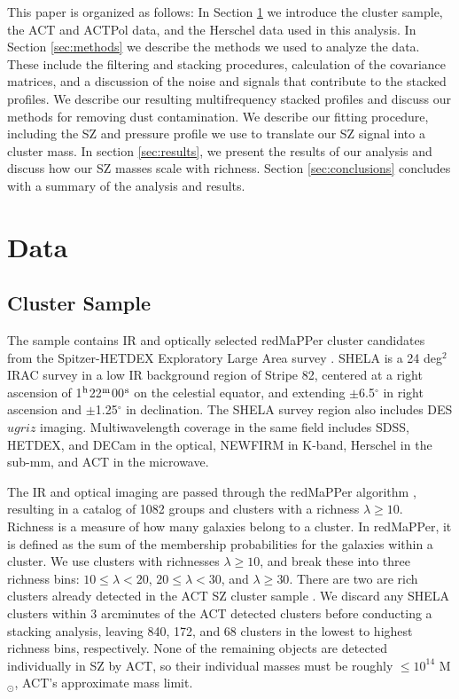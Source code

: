 \documentclass[a4paper,fleqn,usenatbib]{mnras}
\begin{document}
This paper is organized as follows: In Section \ref{sec:data} we introduce the cluster sample, the ACT and ACTPol data, and the Herschel data used in this analysis. In Section \ref{sec:methods} we describe the methods we used to analyze the data. These include the filtering and stacking procedures, calculation of the covariance matrices, and a discussion of the noise and signals that contribute to the stacked profiles. We describe our resulting multifrequency stacked profiles 
and discuss our methods for removing dust contamination. We describe our fitting procedure, including the SZ and pressure profile we use to translate our SZ signal into a cluster mass. In section \ref{sec:results}, we present the results of our analysis and discuss how our SZ masses scale with richness. Section \ref{sec:conclusions} concludes with a summary of the analysis and results.


\section{Data} \label{sec:data}

\subsection{Cluster Sample}
The sample contains IR and optically selected redMaPPer cluster candidates from the Spitzer-HETDEX Exploratory Large Area survey  \citep{2016ApJS..224...28P}. SHELA is a 24 deg$^2$ IRAC survey in a low IR background region of Stripe 82, centered at a right ascension of 1$^{\rm h}$22$^{\rm m}$00$^{\rm s}$ on the celestial equator, and extending $\pm$6.5$^{\circ}$ in right ascension and $\pm$1.25$^{\circ}$ in declination. The SHELA survey region also includes DES $ugriz$ imaging. Multiwavelength coverage in the same field includes SDSS, HETDEX, and DECam in the optical, NEWFIRM in K-band, Herschel in the sub-mm, and ACT in the microwave. 

The IR and optical imaging are passed through the redMaPPer algorithm \citep{2014ApJ...785..104R}, resulting in a catalog of 1082 groups and clusters with a richness $\lambda \geq 10.$ Richness is a measure of how many galaxies belong to a cluster. In redMaPPer, it is defined as the sum of the membership probabilities for the galaxies within a cluster. We use clusters with richnesses $\lambda \geq 10$, and break these into three richness bins: $10 \leq \lambda < 20$, $20 \leq \lambda < 30$, and $\lambda \geq 30$. There are two are rich clusters already detected in the ACT SZ cluster sample \citep{2013JCAP...07..008H}. We discard any SHELA clusters within 3 arcminutes of the ACT detected clusters before conducting a stacking analysis, leaving 840, 172, and 68 clusters in the lowest to highest richness bins, respectively. None of the remaining objects are detected individually in SZ by ACT, so their individual masses must be roughly $\leq 10^{14}$ M$_\odot$, ACT's approximate mass limit.
\end{document}
